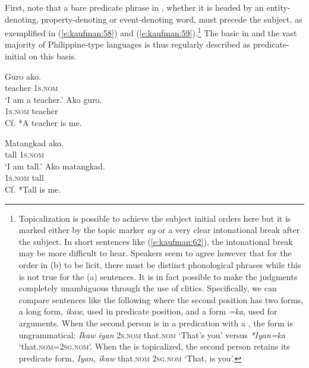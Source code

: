 \documentclass[output=paper]{langsci/langscibook}
\begin{document}
First, note that a bare predicate phrase in , whether it is headed by an entity-denoting, property-denoting or event-denoting word, must precede the subject, as exemplified in (\ref{e:kaufman:58}) and (\ref{e:kaufman:59}).\footnote{Topicalization is possible to achieve the subject initial orders here but it is marked either by the topic marker \textit{ay} or a very clear intonational break after the subject. In short sentences like (\ref{e:kaufman:62}), the intonational break may be more difficult to hear. Speakers seem to agree however that for the order in (b) to be licit, there must be distinct phonological phrases while this is not true for the (a) sentences. It is in fact possible to make the judgments completely unambiguous through the use of clitics. Specifically, we can compare sentences like the following where the second position  has two forms, a long form, \textit{ikaw}, used in predicate position, and a  form \textit{=ka}, used for arguments. When the second person is in a predication with a , the  form is ungrammatical: \textit{Ikaw iyan} \textsc{2s.nom} that.\textsc{nom} `That's you' versus \textit{*Iyan=ka} `that.\textsc{nom=2sg.nom}'. When the  is topicalized, the second person  retains its predicate form, \textit{Iyan, ikaw} that.\textsc{nom 2sg.nom} `That, is you'.} The basic  in  and the vast majority of Philippine-type languages is thus regularly described as predicate-initial on this basis. 

\begin{exe}
	\ex\label{e:kaufman:58}
	\begin{xlist}
		\ex\label{e:kaufman:58a}
        \gll Guro ako.\\
		teacher \textsc{1s.nom}\\
		\glt `I am a teacher.'
		\ex\label{e:kaufman:58b}
        \gll {\USStar}Ako guro.\\
		\phantom{*}\textsc{1s.nom} teacher\\
		Cf. *A teacher is me.
	\end{xlist}
\end{exe}

\begin{exe}
	\ex\label{e:kaufman:59}
	\begin{xlist}
		\ex\label{e:kaufman:59a}
        \gll Matangkad ako.\\
		tall \textsc{1s.nom}\\
		\glt `I am tall.'
		\ex\label{e:kaufman:59b}
        \gll {\USStar}Ako matangkad.\\
		\phantom{*}\textsc{1s.nom} tall\\
		Cf. *Tall is me.
	\end{xlist}
\end{exe}
\end{document}
